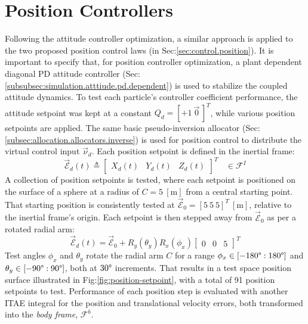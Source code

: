 \section{Position Controllers}
\label{sec:simulation.position}
Following the attitude controller optimization, a similar approach is applied to the two proposed position control laws (in Sec:\ref{sec:control.position}). It is important to specify that, for position controller optimization, a plant dependent diagonal PD attitude controller (Sec:\ref{subsubsec:simulation.atttiude.pd.dependent}) is used to stabilize the coupled attitude dynamics. To test each particle's controller coefficient performance, the attitude setpoint was kept at a constant $Q_d=[+1~\vec{0}\hspace{2pt}]^T$, while various position setpoints are applied. The same basic pseudo-inversion allocator (Sec:\ref{subsec:allocation.allocators.inverse}) is used for position control to distribute the virtual control input $\vec{\nu}_d$. Each position setpoint is defined in the inertial frame:
\begin{equation}
\vec{\mathcal{E}}_d(t)\triangleq\begin{bmatrix}
X_d(t)&
Y_d(t)&
Z_d(t)
\end{bmatrix}^T
~~~~\in\mathcal{F}^{I}
\end{equation}
A collection of position setpoints is tested, where each setpoint is positioned on the surface of a sphere at a radius of $C=5~[\text{m}]$ from a central starting point. That starting position is consistently tested at $\vec{\mathcal{E}}_0=[5~5~5]^{T}~[\text{m}]$, relative to the inertial frame's origin. Each setpoint is then stepped away from $\vec{\mathcal{E}}_0$ as per a rotated radial arm:
\begin{equation}
\vec{\mathcal{E}}_d(t)=\vec{\mathcal{E}}_0+R_y(\theta_{y})R_x(\phi_{x})\begin{bmatrix}
0 & 0 & 5
\end{bmatrix}^T
\end{equation}
Test angles $\phi_x$ and $\theta_y$ rotate the radial arm  $C$ for a range $\phi_x\in[-180\text{\textdegree}:180\text{\textdegree}]$ and $\theta_y\in[-90\text{\textdegree}:90\text{\textdegree}]$, both at $30\text{\textdegree}$ increments. That results in a test space position surface illustrated in Fig:\ref{fig:position-setpoint}, with a total of 91 position setpoints to test. Performance of each position step is evaluated with another ITAE integral for the position and translational velocity errors, both transformed into the \emph{body frame}, $\mathcal{F}^{b}$. 
